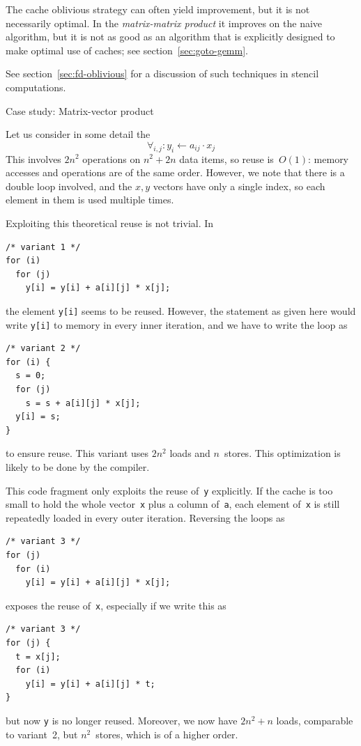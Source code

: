 The cache oblivious strategy can often yield improvement, but it is
not necessarily optimal. In the
%
\emph{matrix-matrix product}
it improves on
the naive algorithm, but it is not as good as an algorithm that is
explicitly designed to make optimal use of caches;
see section~\ref{sec:goto-gemm}.


See section~\ref{sec:fd-oblivious} for a discussion of such techniques
in stencil computations.


 {Case study: Matrix-vector product}
\label{sec:mvp-opt}

Let us consider in some detail
the 
\[ \forall_{i,j}\colon y_i\leftarrow a_{ij}\cdot x_j \] This involves $2n^2$
operations on $n^2+2n$ data items, so reuse is~$O(1)$: memory accesses
and operations are of the same order. However, we note that there is a
double loop involved, and the $x,y$ vectors have only a single index,
so each element in them is used multiple times.

Exploiting this theoretical reuse is not trivial. In
\begin{lstlisting}
/* variant 1 */
for (i)
  for (j)
    y[i] = y[i] + a[i][j] * x[j];
\end{lstlisting}
the element \texttt{y[i]} seems to be reused. However, the statement
as given here would write \texttt{y[i]} to memory in every inner
iteration, and we have to write the loop as
\begin{lstlisting}
/* variant 2 */
for (i) {
  s = 0;
  for (j)
    s = s + a[i][j] * x[j];
  y[i] = s;
}
\end{lstlisting}
to ensure reuse. This variant uses $2n^2$ loads and $n$~stores.
This optimization is likely to be done by the compiler.

This code fragment only exploits the reuse
of~\texttt{y} explicitly. If the cache is too small to hold the whole
vector~\texttt{x} plus a column of~\texttt{a}, each element
of~\texttt{x} is still repeatedly loaded in every outer iteration.
%
Reversing the loops as
\begin{lstlisting}
/* variant 3 */
for (j)
  for (i)
    y[i] = y[i] + a[i][j] * x[j];
\end{lstlisting}
exposes the reuse of~\texttt{x}, especially if we write this as
\begin{lstlisting}
/* variant 3 */
for (j) {
  t = x[j];
  for (i)
    y[i] = y[i] + a[i][j] * t;
}
\end{lstlisting}
but now \texttt{y} is no longer
reused. Moreover, we now have $2n^2+n$ loads, comparable to variant~2,
but $n^2$~stores, which is of a higher order.

